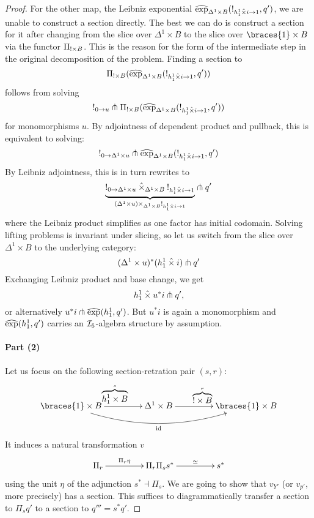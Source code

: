 \documentclass[reqno,10pt,a4paper,oneside]{amsart}
\begin{document}
\begin{proof}
For the other map, the Leibniz exponential $\hatexp_{\Delta^1 \times B}(\canonical_{h_1^1 \hattimes i \to 1}, q')$, we are unable to construct a section directly.
The best we can do is construct a section for it after changing from the slice over $\Delta^1 \times B$ to the slice over $\braces{1} \times B$ via the functor $\Pi_{\canonical \times B}$.
This is the reason for the form of the intermediate step in the original decomposition of the problem.
Finding a section to
\[
\Pi_{\canonical \times B} (\hatexp_{\Delta^1 \times B}(\canonical_{h_1^1 \hattimes i \to 1}, q'))
\]
follows from solving
\[
\canonical_{0 \to u} \pitchfork \Pi_{\canonical \times B} (\hatexp_{\Delta^1 \times B}(\canonical_{h_1^1 \hattimes i \to 1}, q'))
\]
for monomorphisms $u$.
By adjointness of dependent product and pullback, this is equivalent to solving:
\[
\canonical_{0 \to \Delta^1 \times u} \pitchfork \hatexp_{\Delta^1 \times B}(\canonical_{h_1^1 \hattimes i \to 1}, q')\]
By Leibniz adjointness, this is in turn rewrites to
\[
\underbrace{\canonical_{0 \to \Delta^1 \times u} \hattimes_{\Delta^1 \times B} \canonical_{h_1^1 \hattimes i \to 1}}_{(\Delta^1 \times u) \times_{\Delta^1 \times B} \canonical_{h_1^1 \hattimes i \to 1}} \pitchfork q'
\]
where the Leibniz product simplifies as one factor has initial codomain.
Solving lifting problems is invariant under slicing, so let us switch from the slice over $\Delta^1 \times B$ to the underlying category:
\[
(\Delta^1 \times u)^* (h_1^1 \hattimes i) \pitchfork q'
\]
Exchanging Leibniz product and base change, we get
\[
h_1^1 \hattimes u^* i \pitchfork q'
,\]
or alternatively $u^* i \pitchfork \hatexp(h_1^1, q')$.
But $u^* i$ is again a monomorphism and $\hatexp(h_1^1, q')$ carries an $\cal{I}_5$-algebra structure by assumption.

\paragraph{Part (2)}

Let us focus on the following section-retration pair $(s, r)$:
\[
\xymatrix@C+2em{
  \braces{1} \times B
  \ar[r]^{\overbrace{h_1^1 \times B}^s}
  \ar@/_2em/[rr]_{\id}
&
  \Delta^1 \times B
  \ar[r]^{\overbrace{\canonical \times B}^r}
&
  \braces{1} \times B
}
\]
It induces a natural transformation $v$
\[
\xymatrix@C+2em{
  \Pi_r
  \ar[r]^-{\Pi_r \eta}
&
  \Pi_r \Pi_s s^*
  \ar[r]^-{\simeq}  
&
  s^*
}
\]
using the unit $\eta$ of the adjunction $s^* \dashv \Pi_s$.
We are going to show that $v_{Y'}$ (or $v_{p'}$, more precisely) has a section.
This suffices to diagrammatically transfer a section to $\Pi_s q'$ to a section to $q''' = s^* q'$.


\end{proof}
\end{document}
